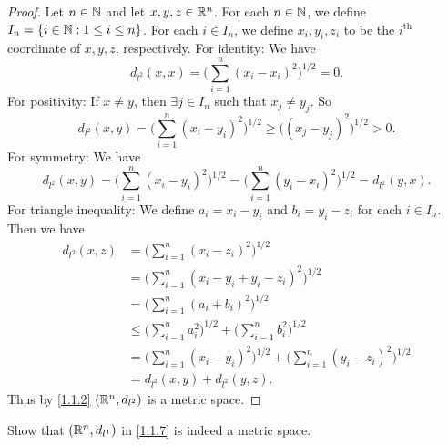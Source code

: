 \begin{proof}
  Let \(n \in \mathbb{N}\) and let \(x, y, z \in \mathbb{R}^n\).
  For each \(n \in \mathbb{N}\), we define \(I_n = \{i \in \mathbb{N} : 1 \leq i \leq n\}\).
  For each \(i \in I_n\), we define \(x_i, y_i, z_i\) to be the \(i^{\text{th}}\) coordinate of \(x, y, z\), respectively.
  For identity:
  We have
  \[
    d_{l^2}(x, x) = \bigg(\sum_{i = 1}^n (x_i - x_i)^2\bigg)^{1 / 2} = 0.
  \]
  For positivity:
  If \(x \neq y\), then \(\exists j \in I_n\) such that \(x_j \neq y_j\).
  So
  \[
    d_{l^2}(x, y) = \bigg(\sum_{i = 1}^n (x_i - y_i)^2\bigg)^{1 / 2} \geq \big((x_j - y_j)^2\big)^{1 / 2} > 0.
  \]
  For symmetry:
  We have
  \[
    d_{l^2}(x, y) = \bigg(\sum_{i = 1}^n (x_i - y_i)^2\bigg)^{1 / 2} = \bigg(\sum_{i = 1}^n (y_i - x_i)^2\bigg)^{1 / 2} = d_{l^2}(y, x).
  \]
  For triangle inequality:
  We define \(a_i = x_i - y_i\) and \(b_i = y_i - z_i\) for each \(i \in I_n\).
  Then we have
  \begin{align*}
    d_{l^2}(x, z) & = \bigg(\sum_{i = 1}^n (x_i - z_i)^2\bigg)^{1 / 2}                                                    \\
                  & = \bigg(\sum_{i = 1}^n (x_i - y_i + y_i - z_i)^2\bigg)^{1 / 2}                                        \\
                  & = \bigg(\sum_{i = 1}^n (a_i + b_i)^2\bigg)^{1 / 2}                                                    \\
                  & \leq \bigg(\sum_{i = 1}^n a_i^2\bigg)^{1 / 2} + \bigg(\sum_{i = 1}^n b_i^2\bigg)^{1 / 2}              \\
                  & = \bigg(\sum_{i = 1}^n (x_i - y_i)^2\bigg)^{1 / 2} + \bigg(\sum_{i = 1}^n (y_i - z_i)^2\bigg)^{1 / 2} \\
                  & = d_{l^2}(x, y) + d_{l^2}(y, z).
  \end{align*}
  Thus by \cref{1.1.2} \((\mathbb{R}^n, d_{l^2})\) is a metric space.
\end{proof}

\begin{ex}\label{ex:1.1.7}
  Show that \((\mathbb{R}^n, d_{l^1})\) in \cref{1.1.7} is indeed a metric space.
\end{ex}

